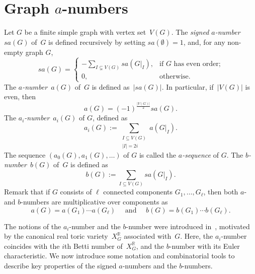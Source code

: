 \documentclass[10pt]{amsart}
\theoremstyle{plain}
\numberwithin{equation}{section}
\theoremstyle{definition}
\newcommand{\R}{\mathbb{R}}
\begin{document}
\section{Graph $a$-numbers}\label{sec:graph}
Let $G$ be a finite simple graph with vertex set~$V(G)$.
The \emph{signed $a$-number}~$sa(G)$ of~$G$ is defined recursively by setting $sa(\emptyset)=1$, and, for any non-empty graph $G$,
$$
    sa(G) = \left\{
          \begin{array}{ll}
            -\sum_{I\subsetneq V(G)}sa(G\vert_I), & \text{if $G$ has even order;} \\
            0, & \text{otherwise.}
          \end{array}
        \right.
$$
The \emph{$a$-number}~$a(G)$ of~$G$ is defined as~$|sa(G)|$.
In particular, if~$|V(G)|$ is even, then
$$
a(G) = (-1)^{\frac{|V(G)|}{2}}sa(G).
$$
The \emph{$a_i$-number}~$a_i(G)$ of $G$, defined as
$$
    a_i(G):=\sum_{\substack{I\subseteq V(G)\\ |I| =2i}}a(G\vert_I).
$$
The sequence $(a_0(G), a_1(G), \ldots )$ of $G$ is called the \emph{$a$-sequence} of $G$.
The \emph{$b$-number}~$b(G)$ of~$G$ is defined as
$$
    b(G):=\sum_{I\subseteq V(G)}sa(G\vert_I).
$$
Remark that if $G$ consists of $\ell$ connected components $G_1 , \ldots, G_\ell$, then both $a$- and $b$-numbers are multiplicative over components as
$$
    a(G)=a(G_1) \cdots a(G_\ell) \quad \text{ and } \quad     b(G)=b(G_1) \cdots b(G_\ell).
$$

The notions of the $a_i$-number and the $b$-number were introduced in~\cite{Choi-Park2015}, motivated by the canonical real toric variety~$X^\R_G$ associated with~$G$.
Here, the $a_i$-number coincides with the $i$th Betti number of~$X^\R_G$, and the $b$-number with its Euler characteristic.
We now introduce some notation and combinatorial tools to describe key properties of the signed $a$-numbers and the $b$-numbers.
\end{document}
